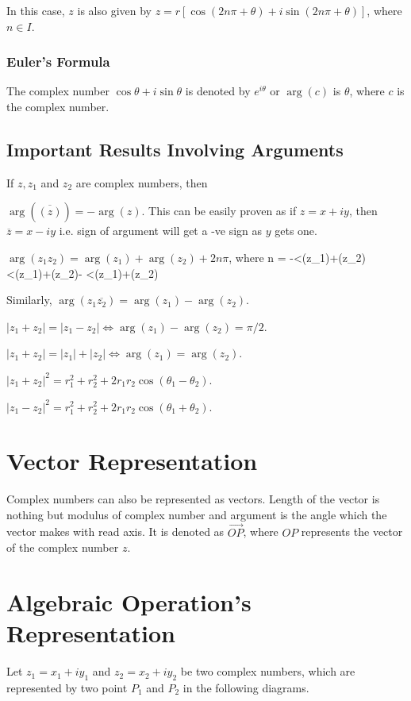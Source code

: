 In this case, $z$ is also given by $z = r[\cos(2n\pi + \theta) + i\sin(2n\pi + \theta)]$, where $n\in I$.

\subsubsection{Euler's Formula}
The complex number $\cos\theta + i\sin\theta$ is denoted by $e^{i\theta}$ or
$\arg(c)$ is $\theta$, where $c$ is the complex number.

\subsection{Important Results Involving Arguments}
If $z, z_1$ and $z_2$ are complex numbers, then

\startitemize[n]
\item $\arg(\overline{(z)}) = -\arg(z)$. This can be easily proven as if $z = x + iy$, then $\overline{z} = x - iy$ i.e. sign of
  argument will get a -ve sign as $y$ gets one.
\item $\arg(z_1z_2) = \arg(z_1)  + \arg(z_2) + 2n\pi$, where
  \startformula n = \startmathcases
    \;\; \NC -\pi<\arg(z_1)+\arg(z_2)\leq\pi\NR
    \;\; \pi<\arg(z_1)+\arg(z_2)\leq-\pi\NR
    \;\; \NC \pi<\arg(z_1)+\arg(z_2)\pi\NR\stopmathcases\stopformula
 \item Similarly, $\arg(z_1\overline{z_2}) = \arg(z_1) - \arg(z_2)$.
 \item $|z_1 + z_2| = |z_1 - z_2| \Leftrightarrow \arg(z_1) - \arg(z_2) = \pi/2$.
 \item $|z_1 + z_2| = |z_1| + |z_2| \Leftrightarrow \arg(z_1) = \arg(z_2)$.
 \item $|z_1 + z_2|^2 = r_1^2 + r_2^2 + 2r_1r_2\cos(\theta_1 - \theta_2)$.
 \item $|z_1 - z_2|^2 = r_1^2 +r_2^2 + 2r_1r_2\cos(\theta_1 + \theta_2)$.
\stopitemize

\section{Vector Representation}
Complex numbers can also be represented as vectors. Length of the vector is nothing but modulus of complex number and argument is
the angle which the vector makes with read axis. It is denoted as $\overrightarrow{OP}$, where $OP$ represents the vector of the
complex number $z$.

\section{Algebraic Operation's Representation}
Let $z_1 = x_1 + iy_1$ and $z_2 = x_2 + iy_2$ be two complex numbers, which are represented by two point $P_1$ and $P_2$ in the
following diagrams.

